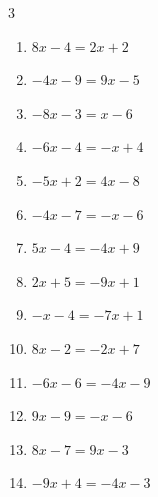 \begin{multicols}{3}
\begin{enumerate}
  \item $8x-4=2x+2$

        \phantom{$\displaystyle x=1$}

  \item $-4x-9=9x-5$


  \item $-8x-3=x-6$


  \item $-6x-4=-x+4$


  \item $-5x+2=4x-8$


  \item $-4x-7=-x-6$


  \item $5x-4=-4x+9$


  \item $2x+5=-9x+1$


  \item $-x-4=-7x+1$


  \item $8x-2=-2x+7$


  \item $-6x-6=-4x-9$


  \item $9x-9=-x-6$


  \item $8x-7=9x-3$

        \phantom{$\displaystyle x=-4$}

\columnbreak %

\resetques

  \item $-9x+4=-4x-3$


\end{enumerate}
\end{multicols}
